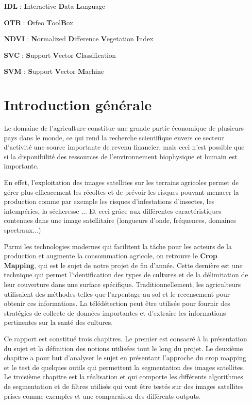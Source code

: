 \documentclass[12pt, openany]{report}
\begin{document}
\textbf{IDL} : \textbf{I}nteractive \textbf{D}ata \textbf{L}anguage
 
\textbf{OTB} : \textbf{O}rfeo \textbf{T}ool\textbf{B}ox
 
\textbf{NDVI} : \textbf{N}ormalized \textbf{D}ifference \textbf{V}egetation \textbf{I}ndex
 
\textbf{SVC} : \textbf{S}upport \textbf{V}ector \textbf{C}lassification
 
\textbf{SVM} : \textbf{S}upport \textbf{V}ector \textbf{M}achine

\listoffigures
\tableofcontents
\chapter*{Introduction générale}

Le domaine de l’agriculture constitue une grande partie économique de plusieurs pays dans le monde, ce qui rend la recherche scientifique envers ce secteur d’activité une source importante de revenu financier, mais ceci n’est possible que si la disponibilité des ressources de l’environnement biophysique et humain est importante.
\par
En effet, l’exploitation des images satellites sur les terrains agricoles permet de gérer plus efficacement les récoltes et de prévoir les risques pouvant menacer la production comme par exemple les risques d’infestations d’insectes, les intempéries, la sécheresse ... Et ceci grâce aux différentes caractéristiques contenues dans une image satellitaire (longueurs d’onde, fréquences, domaines spectraux...)
\par
Parmi les technologies modernes qui facilitent la tâche pour les acteurs de la production et augmente la consommation agricole, on retrouve le \textbf{Crop Mapping}, qui est le sujet de notre projet de fin d’année.  Cette dernière est une technique qui permet l'identification des types de cultures et de la délimitation de leur couverture dans une surface spécifique. Traditionnellement, les agriculteurs utilisaient des méthodes telles que l'arpentage au sol et le recensement pour obtenir ces informations. La télédétection peut être utilisée pour fournir des stratégies de collecte de données importantes et d'extraire les informations pertinentes sur la santé des cultures.

\par
Ce rapport est constitué trois chapitres. Le premier est consacré à la présentation du sujet et la définition des notions utilisées tout le long du projet. Le deuxième chapitre a pour but d'analyser le sujet en présentant l’approche du crop mapping et le test de quelques outils qui permettent la segmentation des images satellites.
Le troisième chapitre est la réalisation et qui comporte les différents algorithmes de segmentation et de filtres utilisés qui vont être testés sur des images satellites prises comme exemples et une comparaison des différents outputs.
\end{document}
